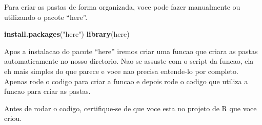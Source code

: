\documentclass[
]{book}
\newenvironment{Shaded}{\begin{snugshade}}{\end{snugshade}}
\newcommand{\FunctionTok}[1]{\textcolor[rgb]{0.13,0.29,0.53}{\textbf{#1}}}
\newcommand{\NormalTok}[1]{#1}
\newcommand{\StringTok}[1]{\textcolor[rgb]{0.31,0.60,0.02}{#1}}
\begin{document}
Para criar as pastas de forma organizada, voce pode fazer manualmente ou utilizando o pacote ``here''.

\begin{Shaded}
\begin{Highlighting}[]
\FunctionTok{install.packages}\NormalTok{(}\StringTok{"here"}\NormalTok{)}
\FunctionTok{library}\NormalTok{(here)}
\end{Highlighting}
\end{Shaded}

Apos a instalacao do pacote ``here'' iremos criar uma funcao que criara as pastas automaticamente no nosso diretorio. Nao se assuste com o script da funcao, ela eh mais simples do que parece e voce nao precisa entende-lo por completo. Apenas rode o codigo para criar a funcao e depois rode o codigo que utiliza a funcao para criar as pastas.

Antes de rodar o codigo, certifique-se de que voce esta no projeto de R que voce criou.
\end{document}
